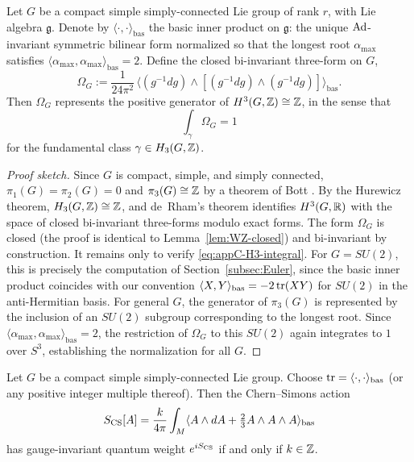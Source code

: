 \begin{theorem}[Generators of $H^3(G,\Z)$]\label{thm:H3-generator}
Let $G$ be a compact simple simply-connected Lie group of rank $r$, with Lie algebra $\mathfrak{g}$. Denote by $\langle\cdot,\cdot\rangle_{\mathrm{bas}}$ the basic inner product on $\mathfrak{g}$: the unique $\operatorname{Ad}$-invariant symmetric bilinear form normalized so that the longest root $\alpha_{\max}$ satisfies $\langle \alpha_{\max},\alpha_{\max}\rangle_{\mathrm{bas}} = 2$. Define the closed bi-invariant three-form on $G$,
\begin{equation}\label{eq:appC-Omega-G}
\Omega_G := \frac{1}{24\pi^2}\,\langle (g^{-1}dg)\wedge [(g^{-1}dg)\wedge (g^{-1}dg)]\rangle_{\mathrm{bas}}.
\end{equation}
Then $\Omega_G$ represents the positive generator of $H^3(G,\mathbb{Z})\cong \mathbb{Z}$, in the sense that
\begin{equation}\label{eq:appC-H3-integral}
\int_\gamma \Omega_G = 1
\end{equation}
for the fundamental class $\gamma\in H_3(G,\mathbb{Z})$.
\end{theorem}

\begin{proof}[Proof sketch]
Since $G$ is compact, simple, and simply connected, $\pi_1(G) = \pi_2(G) = 0$ and $\pi_3(G)\cong \mathbb{Z}$ by a theorem of Bott \cite{Bott1956Application}. By the Hurewicz theorem, $H_3(G,\mathbb{Z})\cong \mathbb{Z}$, and de~Rham's theorem identifies $H^3(G,\mathbb{R})$ with the space of closed bi-invariant three-forms modulo exact forms. The form $\Omega_G$ is closed (the proof is identical to Lemma~\ref{lem:WZ-closed}) and bi-invariant by construction. It remains only to verify \eqref{eq:appC-H3-integral}. For $G = SU(2)$, this is precisely the computation of Section~\ref{subsec:Euler}, since the basic inner product coincides with our convention $\langle X,Y\rangle_{\mathrm{bas}} = -2\operatorname{tr}(XY)$ for $SU(2)$ in the anti-Hermitian basis. For general $G$, the generator of $\pi_3(G)$ is represented by the inclusion of an $SU(2)$ subgroup corresponding to the longest root. Since $\langle\alpha_{\max},\alpha_{\max}\rangle_{\mathrm{bas}}=2$, the restriction of $\Omega_G$ to this $SU(2)$ again integrates to $1$ over $S^3$, establishing the normalization for all $G$.
\end{proof}

\begin{corollary}\label{cor:appC-general-level}
Let $G$ be a compact simple simply-connected Lie group. Choose $\operatorname{tr} = \langle\cdot,\cdot\rangle_{\mathrm{bas}}$ (or any positive integer multiple thereof). Then the Chern--Simons action
\begin{equation*}
S_{\operatorname{CS}}[A] = \frac{k}{4\pi}\int_M \langle A\wedge dA + \tfrac{2}{3}A\wedge A\wedge A\rangle_{\mathrm{bas}}
\end{equation*}
has gauge-invariant quantum weight $e^{iS_{\operatorname{CS}}}$ if and only if $k\in\mathbb{Z}$.
\end{corollary}

